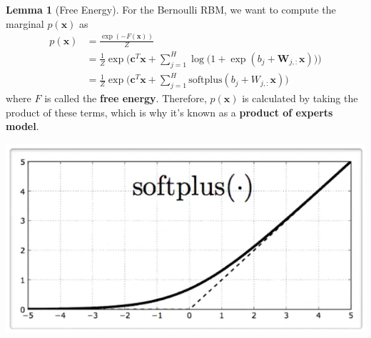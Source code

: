 \documentclass{article}
\theoremstyle{definition}
\newtheorem{lemma}[theorem]{Lemma}
\theoremstyle{remark}
\theoremstyle{definition}
\begin{document}
      \begin{lemma}[Free Energy] 
        For the Bernoulli RBM, we want to compute the marginal $p(\mathbf{x})$ as
        \begin{align*} 
        p(\mathbf{x}) & = \frac{\exp(-F(\mathbf{x}))}{Z} \\
                      & = \frac{1}{Z} \exp \bigg( \mathbf{c}^T \mathbf{x} + \sum_{j=1}^H \log \big( 1 + \exp (b_j + \mathbf{W}_{j, :} \mathbf{x}) \big) \bigg) \\
                      & = \frac{1}{Z} \exp \bigg( \mathbf{c}^T \mathbf{x} + \sum_{j=1}^H \mathrm{softplus}(b_j + W_{j, :} \mathbf{x} ) \bigg)
        \end{align*}
        where $F$ is called the \textbf{free energy}. Therefore, $p(\mathbf{x})$ is calculated by taking the product of these terms, which is why it's known as a \textbf{product of experts model}. 
        \begin{center}
        \includegraphics[scale=0.4]{Images/softplus.png} 
        \end{center}
      \end{lemma}
\end{document}
